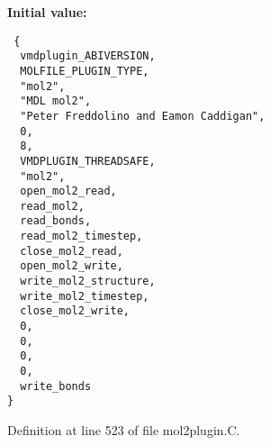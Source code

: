 {\bf Initial value:}

\footnotesize\begin{verbatim} {
  vmdplugin_ABIVERSION,
  MOLFILE_PLUGIN_TYPE,                         
  "mol2",                                      
  "MDL mol2",                                  
  "Peter Freddolino and Eamon Caddigan",       
  0,                                           
  8,                                           
  VMDPLUGIN_THREADSAFE,                        
  "mol2",
  open_mol2_read,               
  read_mol2,                    
  read_bonds,                   
  read_mol2_timestep,           
  close_mol2_read,              
  open_mol2_write,              
  write_mol2_structure,         
  write_mol2_timestep,          
  close_mol2_write,             
  0,                            
  0,                            
  0,                            
  0,                            
  write_bonds                   
}\end{verbatim}\normalsize 


Definition at line 523 of file mol2plugin.C.
